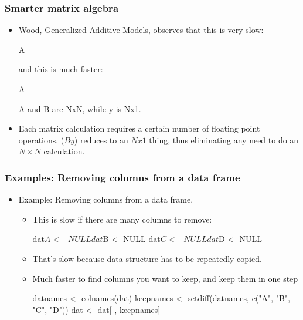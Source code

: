 \documentclass[10pt,english]{beamer}
\begin{document}
\begin{frame}
  \frametitle{Smarter matrix algebra}
  \begin{itemize}
    \item Wood, Generalized Additive Models, observes that this is
      very slow:
\begin{Sinput}
      A %*% B %*% y
\end{Sinput}
      and this is much faster:
\begin{Sinput}      
      A %*% (B %*% y)
\end{Sinput}
 A and B are NxN, while y is Nx1. 
   \item Each matrix calculation requires a certain number of floating
     point operations.  ($B y$) reduces to an $N x 1$ thing, thus
     eliminating any need to do an $N \times N$ calculation.
  \end{itemize}
\end{frame}

\begin{frame}
  \frametitle{Examples: Removing columns from a data frame}
  \begin{itemize}
   \item Example: Removing columns from a data frame. 
     \begin{itemize}
     \item This is slow if there are many columns to remove:
 \begin{Sinput}
 dat$A <- NULL
 dat$B <- NULL
 dat$C <- NULL
 dat$D <- NULL
 \end{Sinput}
     
     \item That's slow because data structure has to be repeatedly copied.
     \item Much faster to find columns you want to keep, and keep them
       in one step
\begin{Sinput}
datnames <- colnames(dat)
keepnames <- setdiff(datnames, c("A", "B", "C", "D"))
dat <- dat[ , keepnames]
\end{Sinput} 
\end{itemize}
\end{itemize}
\end{frame}
 
 
 
\end{document}
